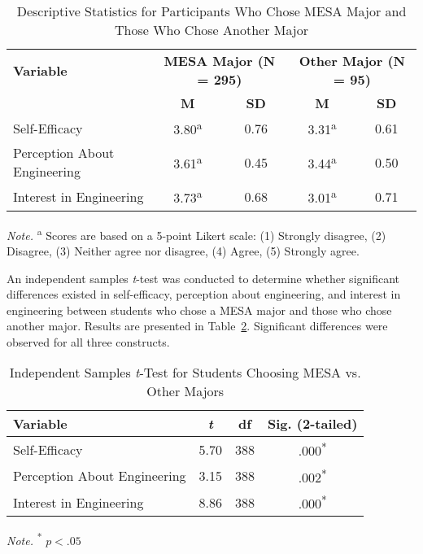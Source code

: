 \documentclass[11pt]{article}
\begin{document}
\begin{table}[h]
\centering
\begin{tabular}{lcccc}
\hline
\textbf{Variable} & \multicolumn{2}{c}{\textbf{MESA Major (N = 295)}} & \multicolumn{2}{c}{\textbf{Other Major (N = 95)}} \\
 & \textbf{M} & \textbf{SD} & \textbf{M} & \textbf{SD} \\
\hline
Self-Efficacy & 3.80\textsuperscript{a} & 0.76 & 3.31\textsuperscript{a} & 0.61 \\
Perception About Engineering & 3.61\textsuperscript{a} & 0.45 & 3.44\textsuperscript{a} & 0.50 \\
Interest in Engineering & 3.73\textsuperscript{a} & 0.68 & 3.01\textsuperscript{a} & 0.71 \\
\hline
\end{tabular}
\caption{Descriptive Statistics for Participants Who Chose MESA Major and Those Who Chose Another Major}
\label{tab:descriptive_major}
\begin{flushleft}
\textit{Note.} \textsuperscript{a} Scores are based on a 5-point Likert scale: (1) Strongly disagree, (2) Disagree, (3) Neither agree nor disagree, (4) Agree, (5) Strongly agree.
\end{flushleft}
\end{table}
An independent samples \textit{t}-test was conducted to determine whether significant differences existed in self-efficacy, perception about engineering, and interest in engineering between students who chose a MESA major and those who chose another major. Results are presented in Table~\ref{tab:ttest_major}. Significant differences were observed for all three constructs.

\begin{table}[h]
\centering
\begin{tabular}{lccc}
\hline
\textbf{Variable} & \textbf{\textit{t}} & \textbf{df} & \textbf{Sig. (2-tailed)} \\
\hline
Self-Efficacy & 5.70 & 388 & .000\textsuperscript{*} \\
Perception About Engineering & 3.15 & 388 & .002\textsuperscript{*} \\
Interest in Engineering & 8.86 & 388 & .000\textsuperscript{*} \\
\hline
\end{tabular}
\caption{Independent Samples \textit{t}-Test for Students Choosing MESA vs. Other Majors}
\label{tab:ttest_major}
\begin{flushleft}
\textit{Note.} \textsuperscript{*} $p < .05$
\end{flushleft}
\end{table}
\end{document}
